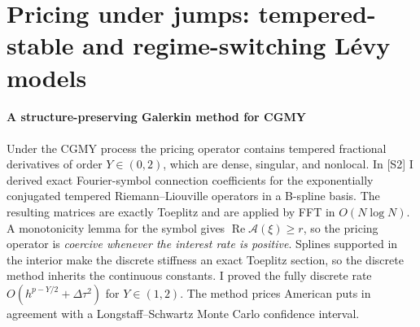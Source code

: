 \documentclass[11pt]{article}
\newcommand{\rc}[1]{\textcolor{accent}{[#1]}}
\begin{document}
\begin{center}
\end{center}
\vspace{-10pt}

\section{Pricing under jumps: tempered-stable and regime-switching L\'evy models}

\paragraph{A structure-preserving Galerkin method for CGMY}
Under the CGMY process the pricing operator contains tempered fractional
derivatives of order $Y\in(0,2)$, which are dense, singular, and nonlocal.
In \rc{S2} I derived exact Fourier-symbol connection coefficients for the
exponentially conjugated tempered Riemann--Liouville operators in a
B-spline basis. The resulting matrices are exactly Toeplitz and are applied
by FFT in $O(N\log N)$. A monotonicity lemma for the symbol gives
$\operatorname{Re}\mathcal A(\xi)\ge r$, so the pricing operator is
\emph{coercive whenever the interest rate is positive}. Splines supported
in the interior make the discrete stiffness an exact Toeplitz section, so
the discrete method inherits the continuous constants. I proved the fully
discrete rate $O(h^{p-Y/2}+\Delta\tau^2)$ for $Y\in(1,2)$. The method prices
American puts in agreement with a Longstaff--Schwartz Monte Carlo
confidence interval.
\end{document}

